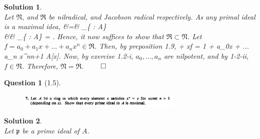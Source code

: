 \documentclass[11pt]{article}
\theoremstyle{plain}
\def\eQb#1\eQe{\begin{eqnarray*}#1\end{eqnarray*}}
\theoremstyle{quest}
\newtheorem*{question}{Question}
\newtheorem*{solution}{Solution}
\begin{document}
\begin{solution} \hfill \\
Let $\mathfrak{N}$, and $\mathfrak{R}$ be nilradical, and Jacobson radical 
respectively. As any primal ideal is a maximal idea,
\eQb
\mathfrak{N} &=& \bigcap_{\{ \> : \>  
\> A\}}  \\ 
&\subset& 
\bigcap_{\{  \> : \>  \> A\}} 
= .
\eQe
Hence, it now suffices to show that $\mathfrak{R} \subset \mathfrak{N}$.
Let $f = a_0 + a_1x + ... + a_n x^n \in \mathfrak{R}$. Then, by preposition 1.9,
\eQb
1 + xf = 1 + a_0x + ... a_n x^n{n+1} \>\>\>  \>\>\> A[x].
\eQe 
Now, by exercise 1.2-i, $a_0 , ... , a_n$ are nilpotent, and by 1-2-ii,
$f \in \mathfrak{N}$. Therefore, $\mathfrak{N} = \mathfrak{R}$. \hfill $\qed$


\end{solution}

\bigskip

\begin{question}[1.5]
\hfill
\begin{figure}[h!]
  \centering
    \includegraphics[width=0.7\textwidth]{d-1-7.png}
\end{figure}
\end{question}
\begin{solution} \hfill \\
Let $\mathfrak{p}$ be a prime ideal of $A$. 

\end{solution}

\newpage
\end{document}
